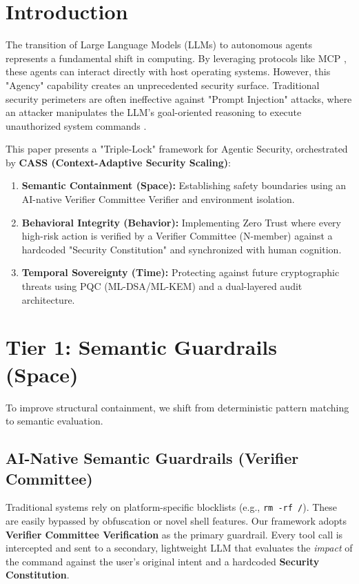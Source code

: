 \documentclass[conference]{IEEEtran}
\begin{document}
\section{Introduction}
The transition of Large Language Models (LLMs) to autonomous agents represents a fundamental shift in computing. By leveraging protocols like MCP \cite{mcp2024}, these agents can interact directly with host operating systems. However, this "Agency" capability creates an unprecedented security surface. Traditional security perimeters are often ineffective against "Prompt Injection" attacks, where an attacker manipulates the LLM's goal-oriented reasoning to execute unauthorized system commands \cite{perez2022ignore}.

This paper presents a "Triple-Lock" framework for Agentic Security, orchestrated by \textbf{CASS (Context-Adaptive Security Scaling)}:
\begin{enumerate}
    \item \textbf{Semantic Containment (Space):} Establishing safety boundaries using an AI-native Verifier Committee Verifier and environment isolation.
    \item \textbf{Behavioral Integrity (Behavior):} Implementing Zero Trust where every high-risk action is verified by a Verifier Committee (N-member) against a hardcoded "Security Constitution" and synchronized with human cognition.
    \item \textbf{Temporal Sovereignty (Time):} Protecting against future cryptographic threats using PQC (ML-DSA/ML-KEM) and a dual-layered audit architecture.
\end{enumerate}

\section{Tier 1: Semantic Guardrails (Space)}
To improve structural containment, we shift from deterministic pattern matching to semantic evaluation.

\subsection{AI-Native Semantic Guardrails (Verifier Committee)}
Traditional systems rely on platform-specific blocklists (e.g., \texttt{rm -rf /}). These are easily bypassed by obfuscation or novel shell features. Our framework adopts \textbf{Verifier Committee Verification} as the primary guardrail. Every tool call is intercepted and sent to a secondary, lightweight LLM that evaluates the \textit{impact} of the command against the user's original intent and a hardcoded \textbf{Security Constitution}.
\end{document}
